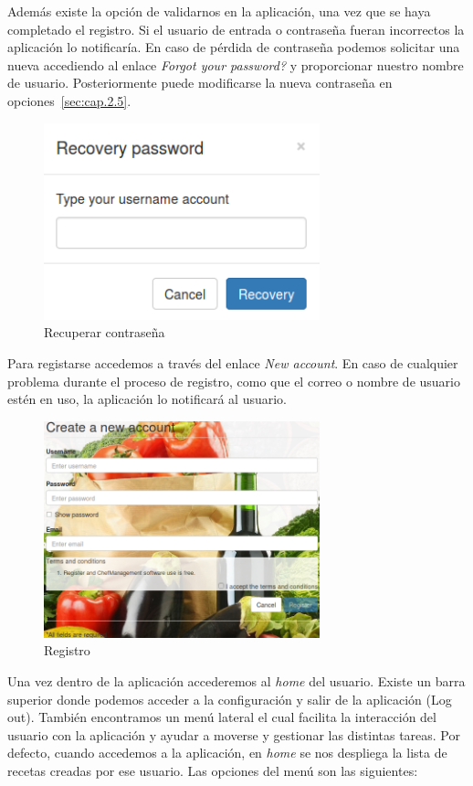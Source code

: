 Además existe la opción de validarnos en la aplicación, una vez que se haya completado el registro. Si el usuario de entrada o contraseña fueran incorrectos la aplicación lo notificaría. En caso de pérdida de contraseña podemos solicitar una nueva accediendo al enlace \emph{Forgot your password?} y proporcionar nuestro nombre de usuario. Posteriormente puede modificarse la nueva contraseña en opciones~\ref{sec:cap.2.5}.

\begin{figure}[H]
	\centering
	\includegraphics[width=8cm]{./images/chefmanagement-recovery.png}
	\caption{Recuperar contraseña} \label{fig:chefmanagement-recovery}
\end{figure}

Para registarse accedemos a través del enlace \emph{New account}. En caso de cualquier problema durante el proceso de registro, como que el correo o nombre de usuario estén en uso, la aplicación lo notificará al usuario.

\begin{figure}[H]
	\centering
	\includegraphics[width=8cm]{./images/chefmanagement-register.png}
	\caption{Registro} \label{fig:chefmanagement-register}
\end{figure}

Una vez dentro de la aplicación accederemos al \emph{home} del usuario. Existe un barra superior donde podemos acceder a la configuración y salir de la aplicación (Log out). También encontramos un menú lateral el cual facilita la interacción del usuario con la aplicación y ayudar a moverse y gestionar las distintas tareas. Por defecto, cuando accedemos a la aplicación, en \emph{home} se nos despliega la lista de recetas creadas por ese usuario. Las opciones del menú son las siguientes:

